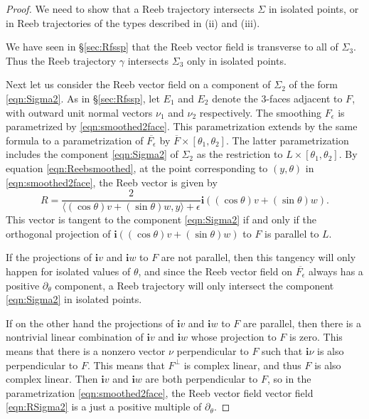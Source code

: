 \begin{proof}
We need to show that a Reeb trajectory intersects $\Sigma$ in isolated points, or in Reeb trajectories of the types described in (ii) and (iii).

We have seen in \S\ref{sec:Rfssp} that the Reeb vector field is transverse to all of $\Sigma_3$. Thus the Reeb trajectory $\gamma$ intersects $\Sigma_3$ only in isolated points.

Next let us consider the Reeb vector field on a component of $\Sigma_2$ of the form \eqref{eqn:Sigma2}. As in \S\ref{sec:Rfssp}, let $E_1$ and $E_2$ denote the $3$-faces adjacent to $F$, with outward unit normal vectors $\nu_1$ and $\nu_2$ respectively. The smoothing $F_\epsilon$ is parametrized by \eqref{eqn:smoothed2face}. This parametrization extends by the same formula to a parametrization of $\overline{F_\epsilon}$ by $\overline{F}\times [\theta_1,\theta_2]$. The latter parametrization includes the component \eqref{eqn:Sigma2} of $\Sigma_2$ as the restriction to $L\times [\theta_1,\theta_2]$. By equation \eqref{eqn:Reebsmoothed}, at the point corresponding to $(y,\theta)$ in \eqref{eqn:smoothed2face}, the Reeb vector is given by
\begin{equation}
\label{eqn:RSigma2}
R = \frac{2}{\langle (\cos\theta)v+(\sin\theta)w,y\rangle + \epsilon}{\mathbf i}((\cos\theta) v + (\sin\theta) w).
\end{equation}
This vector is tangent to the component \eqref{eqn:Sigma2} if and only if the orthogonal projection of ${\mathbf i}((\cos\theta)v + (\sin\theta)w)$ to $F$ is parallel to $L$.

If the projections of ${\mathbf i}v$ and ${\mathbf i}w$ to $F$ are not parallel, then this tangency will only happen for isolated values of $\theta$, and since the Reeb vector field on $\overline{F_\epsilon}$ always has a positive $\partial_\theta$ component, a Reeb trajectory will only intersect the component \eqref{eqn:Sigma2} in isolated points.

If on the other hand the projections of ${\mathbf i}v$ and ${\mathbf i}w$ to $F$ are parallel, then there is a nontrivial linear combination of ${\mathbf i}v$ and ${\mathbf i}w$ whose projection to $F$ is zero. This means that there is a nonzero vector $\nu$ perpendicular to $F$ such that ${\mathbf i}\nu$ is also perpendicular to $F$. This means that $F^\perp$ is complex linear, and thus $F$ is also complex linear. Then ${\mathbf i}v$ and ${\mathbf i}w$ are both perpendicular to $F$, so in the parametrization \eqref{eqn:smoothed2face}, the Reeb vector field vector field \eqref{eqn:RSigma2} is a just a positive multiple of $\partial_\theta$.


\end{proof}
